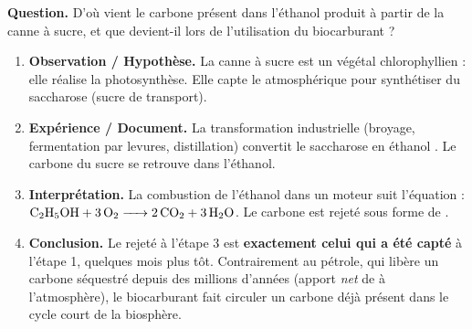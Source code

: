 \documentclass[11pt]{article}
\begin{document}
\begin{methode}
\textbf{Question.} D'où vient le carbone présent dans l'éthanol  produit à partir de la canne à sucre, et que devient-il lors de l'utilisation du biocarburant ?
\begin{enumerate}
\item \textbf{Observation / Hypothèse.} La canne à sucre est un végétal chlorophyllien : elle réalise la photosynthèse. Elle capte le  atmosphérique pour synthétiser du saccharose (sucre de transport).
\item \textbf{Expérience / Document.} La transformation industrielle (broyage, fermentation par levures, distillation) convertit le saccharose  en éthanol . Le carbone du sucre se retrouve dans l'éthanol.
\item \textbf{Interprétation.} La combustion de l'éthanol dans un moteur suit l'équation : $\ce{C2H5OH + 3O2 -> 2CO2 + 3H2O}$. Le carbone est rejeté sous forme de .
\item \textbf{Conclusion.} Le  rejeté à l'étape 3 est \textbf{exactement celui qui a été capté} à l'étape 1, quelques mois plus tôt. Contrairement au pétrole, qui libère un carbone séquestré depuis des millions d'années (apport \emph{net} de  à l'atmosphère), le biocarburant fait circuler un carbone déjà présent dans le cycle court de la biosphère.
\end{enumerate}
\end{methode}
\end{document}
